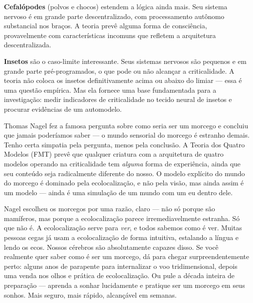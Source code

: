 \documentclass[11pt, twoside, openright]{book}
\begin{document}
\textbf{Cefalópodes} (polvos e chocos) estendem a lógica ainda mais. Seu sistema nervoso é em grande parte descentralizado, com processamento autônomo substancial nos braços. A teoria prevê alguma forma de consciência, provavelmente com características incomuns que refletem a arquitetura descentralizada.

\textbf{Insetos} são o caso-limite interessante. Seus sistemas nervosos são pequenos e em grande parte pré-programados, o que pode ou não alcançar a criticalidade. A teoria não coloca os insetos definitivamente acima ou abaixo do limiar --- essa é uma questão empírica. Mas ela fornece uma base fundamentada para a investigação: medir indicadores de criticalidade no tecido neural de insetos e procurar evidências de um automodelo.

Thomas Nagel fez a famosa pergunta sobre como seria ser um morcego e concluiu que jamais poderíamos saber --- o mundo sensorial do morcego é estranho demais. Tenho certa simpatia pela pergunta, menos pela conclusão. A Teoria dos Quatro Modelos (FMT) prevê que qualquer criatura com a arquitetura de quatro modelos operando na criticalidade tem \textit{alguma} forma de experiência, ainda que seu conteúdo seja radicalmente diferente do nosso. O modelo explícito do mundo do morcego é dominado pela ecolocalização, e não pela visão, mas ainda assim é um modelo --- ainda é uma simulação de um mundo com um eu dentro dele.

Nagel escolheu os morcegos por uma razão, claro --- não só porque são mamíferos, mas porque a ecolocalização parece irremediavelmente estranha. Só que não é. A ecolocalização serve para \textit{ver}, e todos sabemos como é ver. Muitas pessoas cegas já usam a ecolocalização de forma intuitiva, estalando a língua e lendo os ecos. Nossos cérebros são absolutamente capazes disso. Se você realmente quer saber como é ser um morcego, dá para chegar surpreendentemente perto: alguns anos de parapente para internalizar o voo tridimensional, depois uma venda nos olhos e prática de ecolocalização. Ou pule a década inteira de preparação --- aprenda a sonhar lucidamente e pratique ser um morcego em seus sonhos. Mais seguro, mais rápido, alcançável em semanas.
\end{document}
